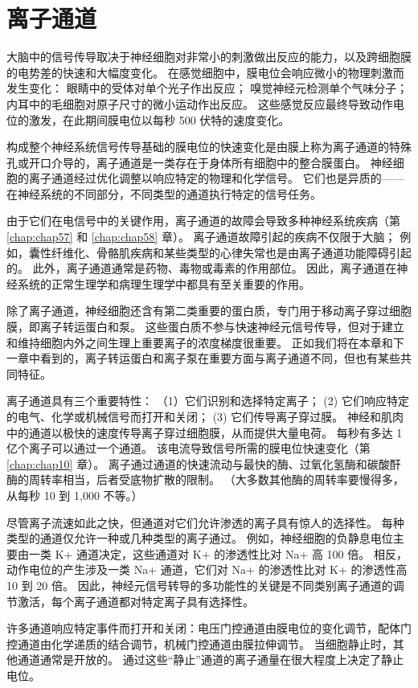 \chapter{离子通道} \label{chap:chap8}
大脑中的信号传导取决于神经细胞对非常小的刺激做出反应的能力，以及跨细胞膜的电势差的快速和大幅度变化。 
在感觉细胞中，膜电位会响应微小的物理刺激而发生变化：
眼睛中的受体对单个光子作出反应； 嗅觉神经元检测单个气味分子； 
内耳中的毛细胞对原子尺寸的微小运动作出反应。 
这些感觉反应最终导致动作电位的激发，在此期间膜电位以每秒 500 伏特的速度变化。


构成整个神经系统信号传导基础的膜电位的快速变化是由膜上称为离子通道的特殊孔或开口介导的，离子通道是一类存在于身体所有细胞中的整合膜蛋白。 
神经细胞的离子通道经过优化调整以响应特定的物理和化学信号。 
它们也是异质的——在神经系统的不同部分，不同类型的通道执行特定的信号任务。


由于它们在电信号中的关键作用，离子通道的故障会导致多种神经系统疾病（第 \ref{chap:chap57} 和 \ref{chap:chap58} 章）。 
离子通道故障引起的疾病不仅限于大脑； 
例如，囊性纤维化、骨骼肌疾病和某些类型的心律失常也是由离子通道功能障碍引起的。 
此外，离子通道通常是药物、毒物或毒素的作用部位。
因此，离子通道在神经系统的正常生理学和病理生理学中都具有至关重要的作用。


除了离子通道，神经细胞还含有第二类重要的蛋白质，专门用于移动离子穿过细胞膜，即离子转运蛋白和泵。 
这些蛋白质不参与快速神经元信号传导，但对于建立和维持细胞内外之间生理上重要离子的浓度梯度很重要。 
正如我们将在本章和下一章中看到的，离子转运蛋白和离子泵在重要方面与离子通道不同，但也有某些共同特征。


离子通道具有三个重要特性：
（1）它们识别和选择特定离子； 
(2) 它们响应特定的电气、化学或机械信号而打开和关闭； 
(3) 它们传导离子穿过膜。 
神经和肌肉中的通道以极快的速度传导离子穿过细胞膜，从而提供大量电荷。 
每秒有多达 1 亿个离子可以通过一个通道。 
该电流导致信号所需的膜电位快速变化（第 \ref{chap:chap10} 章）。 
离子通过通道的快速流动与最快的酶、过氧化氢酶和碳酸酐酶的周转率相当，后者受底物扩散的限制。 
（大多数其他酶的周转率要慢得多，从每秒 10 到 1,000 不等。）


尽管离子流速如此之快，但通道对它们允许渗透的离子具有惊人的选择性。 
每种类型的通道仅允许一种或几种类型的离子通过。 
例如，神经细胞的负静息电位主要由一类 K+ 通道决定，这些通道对 K+ 的渗透性比对 Na+ 高 100 倍。 
相反，动作电位的产生涉及一类 Na+ 通道，它们对 Na+ 的渗透性比对 K+ 的渗透性高 10 到 20 倍。 
因此，神经元信号转导的多功能性的关键是不同类别离子通道的调节激活，每个离子通道都对特定离子具有选择性。


许多通道响应特定事件而打开和关闭：电压门控通道由膜电位的变化调节，配体门控通道由化学递质的结合调节，机械门控通道由膜拉伸调节。 
当细胞静止时，其他通道通常是开放的。 
通过这些“静止”通道的离子通量在很大程度上决定了静止电位。


